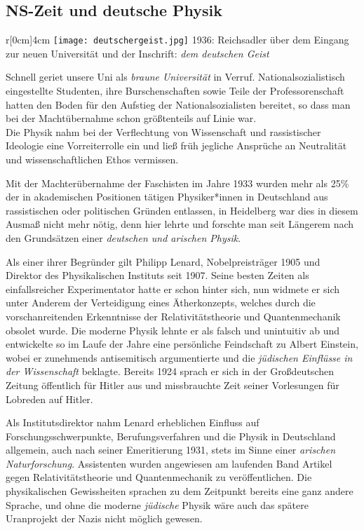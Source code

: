 \subsection*{NS-Zeit und deutsche Physik}
\begin{wrapfigure}{r}[0cm]{4cm}
\vspace{-13pt}
\texttt{[image: deutschergeist.jpg]}
\small{1936: Reichsadler über dem Eingang zur neuen Universität und der Inschrift: \textit{dem deutschen Geist}}
\vspace{-15pt}
\end{wrapfigure}

Schnell geriet unsere Uni als \textit{braune Universität} in Verruf. Nationalsozialistisch eingestellte Studenten, ihre Burschenschaften sowie Teile der Professorenschaft hatten den Boden für den Aufstieg der Nationalsozialisten bereitet, so dass man bei der Machtübernahme schon größtenteils auf Linie war.\\
Die Physik nahm bei der Verflechtung von Wissenschaft und rassistischer Ideologie eine Vorreiterrolle ein und ließ früh jegliche Ansprüche an Neutralität und wissenschaftlichen Ethos vermissen.

Mit der Machterübernahme der Faschisten im Jahre 1933 wurden mehr als 25\% der in akademischen Positionen tätigen Physiker*innen in Deutschland aus rassistischen oder politischen Gründen entlassen, in Heidelberg war dies in diesem Ausmaß nicht mehr nötig, denn hier lehrte und forschte man seit Längerem nach den Grundsätzen einer \textit{deutschen und arischen Physik}.

Als einer ihrer Begründer gilt Philipp Lenard, Nobelpreisträger 1905 und Direktor des Physikalischen Instituts seit 1907. 
Seine besten Zeiten als einfallsreicher Experimentator hatte er schon hinter sich, nun widmete er sich unter Anderem der Verteidigung eines Ätherkonzepts, welches durch die vorschanreitenden Erkenntnisse der Relativitätstheorie und Quantenmechanik obsolet wurde. Die moderne Physik lehnte er als falsch und unintuitiv ab und entwickelte so im Laufe der Jahre eine persönliche Feindschaft zu Albert Einstein, wobei er zunehmends antisemitisch argumentierte und die \textit{jüdischen Einflüsse in der Wissenschaft} beklagte. Bereits 1924 sprach er sich in der Großdeutschen Zeitung öffentlich für Hitler aus und missbrauchte Zeit seiner Vorlesungen für Lobreden auf Hitler.

Als Institutsdirektor nahm Lenard erheblichen Einfluss auf Forschungsschwerpunkte, Berufungsverfahren und die Physik in Deutschland allgemein, auch nach seiner Emeritierung 1931, stets im Sinne einer \textit{arischen Naturforschung}. Assistenten wurden angewiesen am laufenden Band Artikel gegen Relativitätstheorie und Quantenmechanik zu veröffentlichen. Die physikalischen Gewissheiten sprachen zu dem Zeitpunkt bereits eine ganz andere Sprache, und ohne die moderne \textit{jüdische} Physik wäre auch das spätere Uranprojekt der Nazis nicht möglich gewesen. 

